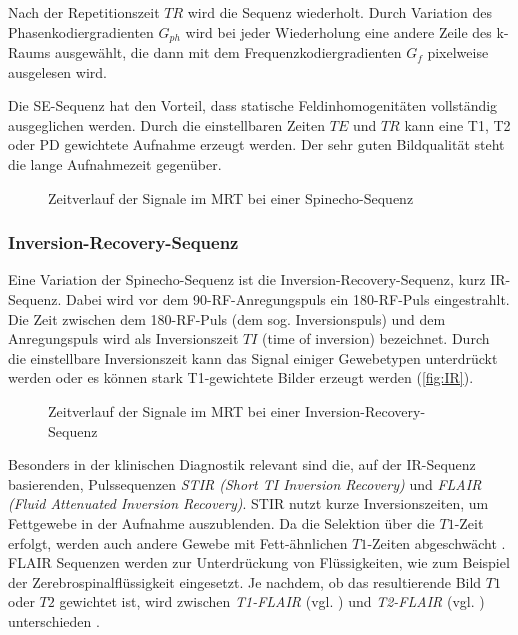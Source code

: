 Nach der Repetitionszeit $TR$ wird die Sequenz wiederholt. Durch Variation des Phasenkodiergradienten $G_{ph}$ wird bei jeder Wiederholung eine andere Zeile des k-Raums ausgewählt, die dann mit dem Frequenzkodiergradienten $G_f$ pixelweise ausgelesen wird.


Die SE-Sequenz hat den Vorteil, dass statische Feldinhomogenitäten vollständig ausgeglichen werden. Durch die einstellbaren Zeiten $TE$ und $TR$ kann eine T1, T2 oder PD gewichtete Aufnahme erzeugt werden.
Der sehr guten Bildqualität steht die lange Aufnahmezeit gegenüber.

\begin{figure}[H]
	\centering
	\caption[Spinecho-Sequenz]{Zeitverlauf der Signale im MRT bei einer Spinecho-Sequenz}
	\label{fig:SE}
\end{figure}

\subsubsection{Inversion-Recovery-Sequenz}
\label{sec:IR}
Eine Variation der Spinecho-Sequenz ist die Inversion-Recovery-Sequenz, kurz IR-Sequenz. Dabei wird vor dem 90\degree-RF-Anregungspuls ein 180\degree-RF-Puls eingestrahlt. Die Zeit zwischen dem 180\degree-RF-Puls (dem sog. Inversionspuls) und dem Anregungspuls wird als Inversionszeit $TI$ (time of inversion) bezeichnet. Durch die einstellbare Inversionszeit kann das Signal einiger Gewebetypen unterdrückt werden oder es können stark T1-gewichtete Bilder erzeugt werden (\autoref{fig:IR}).

\begin{figure}[H]
	\centering
	\caption[Inversion-Recovery-Sequenz]{Zeitverlauf der Signale im MRT bei einer Inversion-Recovery-Sequenz}
	\label{fig:IR}
\end{figure}

Besonders in der klinischen Diagnostik relevant sind die, auf der IR-Sequenz basierenden, Pulssequenzen \textit{STIR (Short TI Inversion Recovery)} und \textit{FLAIR (Fluid Attenuated Inversion Recovery)}.
STIR nutzt kurze Inversionszeiten, um Fettgewebe in der Aufnahme auszublenden. Da die Selektion über die $T1$-Zeit erfolgt, werden auch andere Gewebe mit Fett-ähnlichen $T1$-Zeiten abgeschwächt \cite{Bydder1985}.
FLAIR Sequenzen werden zur Unterdrückung von Flüssigkeiten, wie zum Beispiel der Zerebrospinalflüssigkeit eingesetzt. Je nachdem, ob das resultierende Bild $T1$ oder $T2$ gewichtet ist, wird zwischen \textit{T1-FLAIR} (vgl. \cite{Melhem1997}) und \textit{T2-FLAIR} (vgl. \cite{Hajnal1992}) unterschieden \cite{Bakshi2001}.

